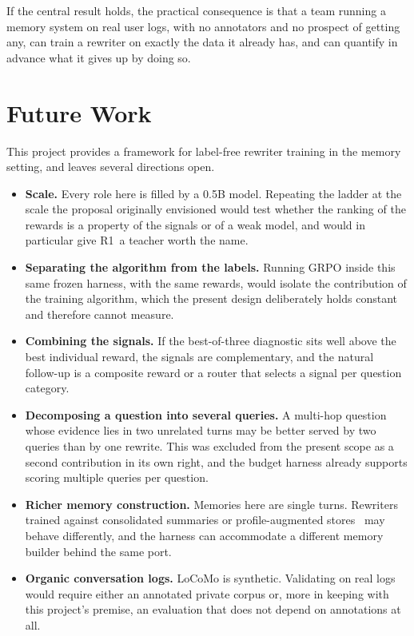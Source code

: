 \documentclass[12pt,letterpaper,oneside]{report}
\newcommand{\Ra}{R1}
\begin{document}
If the central result holds, the practical consequence is that a team running a
memory system on real user logs, with no annotators and no prospect of getting
any, can train a rewriter on exactly the data it already has, and can quantify
in advance what it gives up by doing so.

\section{Future Work}
\label{sec:future}

This project provides a framework for label-free rewriter training in the
memory setting, and leaves several directions open.

\begin{itemize}[leftmargin=*,itemsep=4pt,topsep=4pt]
\item \textbf{Scale.} Every role here is filled by a 0.5B model. Repeating the
ladder at the scale the proposal originally envisioned would test whether the
ranking of the rewards is a property of the signals or of a weak model, and
would in particular give \Ra\ a teacher worth the name.

\item \textbf{Separating the algorithm from the labels.} Running GRPO inside
this same frozen harness, with the same rewards, would isolate the contribution
of the training algorithm, which the present design deliberately holds
constant and therefore cannot measure.

\item \textbf{Combining the signals.} If the best-of-three diagnostic sits well
above the best individual reward, the signals are complementary, and the
natural follow-up is a composite reward or a router that selects a signal per
question category.

\item \textbf{Decomposing a question into several queries.} A multi-hop
question whose evidence lies in two unrelated turns may be better served by two
queries than by one rewrite. This was excluded from the present scope as a
second contribution in its own right, and the budget harness already supports
scoring multiple queries per question.

\item \textbf{Richer memory construction.} Memories here are single turns.
Rewriters trained against consolidated summaries or profile-augmented
stores~\cite{mem0,memorybank,ppro} may behave differently, and the harness can
accommodate a different memory builder behind the same port.

\item \textbf{Organic conversation logs.} LoCoMo is synthetic. Validating on
real logs would require either an annotated private corpus or, more in keeping
with this project's premise, an evaluation that does not depend on annotations
at all.
\end{itemize}
\end{document}
